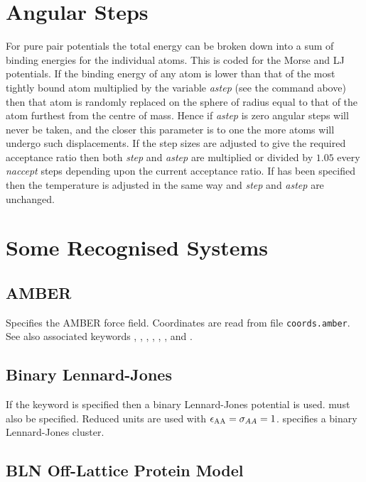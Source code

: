 {\section{Angular Steps}

For pure pair potentials the total energy can be broken down into a sum of binding
energies for the individual atoms. This is coded for the Morse and LJ potentials.
If the binding energy of any atom is lower than that of the most tightly bound atom
multiplied by the variable {\it astep\/} (see the {\/} command above) then
that atom is randomly replaced on the sphere of radius equal to that of the atom furthest
from the centre of mass. Hence if {\it astep\/} is zero angular steps will never be taken,
and the closer this parameter is to one the more atoms will undergo such displacements.
If the step sizes are adjusted to give the required acceptance ratio then both {\it step\/} and
{\it astep\/} are multiplied or divided by $1.05$ every {\it naccept\/} steps depending
upon the current acceptance ratio. If {\/} has been specified then the temperature
is adjusted in the same way and {\it step\/} and {\it astep\/} are unchanged.

\section{Some Recognised Systems}

\subsection{AMBER}

Specifies the AMBER force field. Coordinates are read from file {\tt coords.amber}.
See also associated keywords {\/}, {\/}, {\/}, {\/},
{\/}, {\/}, {\/} and {\/}.

\subsection{Binary Lennard-Jones}

If the {\/} keyword is specified then a binary Lennard-Jones
potential is used\cite{sastryds98}. {\/} must also be
specified. Reduced units are used with $\epsilon_{\rm AA}=\sigma_{AA}=1$.
{\/} specifies a binary Lennard-Jones cluster.

\subsection{BLN Off-Lattice Protein Model}
\label{sec:BLN}

}
